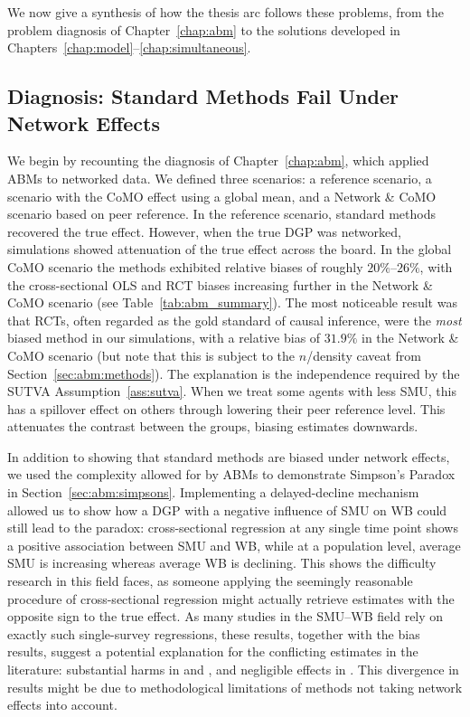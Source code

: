 We now give a synthesis of how the thesis arc follows these problems, from the problem diagnosis of Chapter~\ref{chap:abm} to the solutions developed in Chapters~\ref{chap:model}--\ref{chap:simultaneous}.

\subsection{Diagnosis: Standard Methods Fail Under Network Effects}

We begin by recounting the diagnosis of Chapter~\ref{chap:abm}, which applied ABMs to networked data. We defined three scenarios: a reference scenario, a scenario with the CoMO effect using a global mean, and a Network \& CoMO scenario based on peer reference. In the reference scenario, standard methods recovered the true effect. However, when the true DGP was networked, simulations showed attenuation of the true effect across the board. In the global CoMO scenario the methods exhibited relative biases of roughly $20\%$--$26\%$, with the cross-sectional OLS and RCT biases increasing further in the Network \& CoMO scenario (see Table~\ref{tab:abm_summary}). The most noticeable result was that RCTs, often regarded as the gold standard of causal inference, were the \emph{most} biased method in our simulations, with a relative bias of $31.9\%$ in the Network \& CoMO scenario (but note that this is subject to the $n$/density caveat from Section~\ref{sec:abm:methods}). The explanation is the independence required by the SUTVA Assumption~\ref{ass:sutva}. When we treat some agents with less SMU, this has a spillover effect on others through lowering their peer reference level. This attenuates the contrast between the groups, biasing estimates downwards.

In addition to showing that standard methods are biased under network effects, we used the complexity allowed for by ABMs to demonstrate Simpson's Paradox in Section~\ref{sec:abm:simpsons}. Implementing a delayed-decline mechanism allowed us to show how a DGP with a negative influence of SMU on WB could still lead to the paradox: cross-sectional regression at any single time point shows a positive association between SMU and WB, while at a population level, average SMU is increasing whereas average WB is declining. This shows the difficulty research in this field faces, as someone applying the seemingly reasonable procedure of cross-sectional regression might actually retrieve estimates with the opposite sign to the true effect. As many studies in the SMU--WB field rely on exactly such single-survey regressions, these results, together with the bias results, suggest a potential explanation for the conflicting estimates in the literature: substantial harms in \textcite{Twenge2018} and \textcite{Haidt2024}, and negligible effects in \textcite{Orben2019}. This divergence in results might be due to methodological limitations of methods not taking network effects into account.

